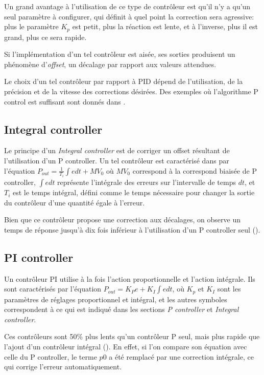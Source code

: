 Un grand avantage à l'utilisation de ce type de contrôleur est qu'il n'y a qu'un seul paramètre à configurer, qui définit à quel point la correction sera agressive: plus le paramètre $K_{p}$ est petit, plus la réaction est lente, et à l'inverse, plus il est grand, plus ce sera rapide.

Si l'implémentation d'un tel contrôleur est aisée, ses sorties produisent un phénomène d'\emph{offset}, un décalage par rapport aux valeurs attendues.

Le choix d'un tel contrôleur par rapport à PID dépend de l'utilisation, de la précision et de la vitesse des corrections désirées.
Des exemples où l'algorithme P control est suffisant sont donnés dans \cite{sellers2001overview}.

\subsection{Integral controller}
Le principe d'un \emph{Integral controller} est de corriger un offset résultant de l'utilisation d'un P controller.
Un tel contrôleur est caractérisé dans \cite{svrcek2006real} par l'équation
$P_{out} = \frac{1}{T_{i}}\int e dt + MV_{0}$ où $MV_{0}$ correspond à la correspond biaisée de P controller,
$\int e dt$ représente l'intégrale des erreurs sur l'intervalle de temps $dt$, et $T_{i}$ est le temps intégral, défini comme le temps nécessaire pour changer la sortie du contrôleur d'une quantité égale à l'erreur.

Bien que ce contrôleur propose une correction aux décalages, on observe un temps de réponse jusqu'à dix fois inférieur à l'utilisation d'un P controller seul (\cite{svrcek2006real}).

\subsection{PI controller}
Un contrôleur PI utilise à la fois l'action proportionnelle et l'action intégrale.
Ils sont caractérisés par l'équation $P_{out} = K_{P} e + K_{I} \int e dt$, où $K_{p}$ et $K_{I}$ sont les paramètres de réglages proportionnel et intégral,
et les autres symboles correspondent à ce qui est indiqué dans les sections \emph{P controller} et \emph{Integral controller}.

Ces contrôleurs sont 50\% plus lents qu'un contrôleur P seul, mais plus rapide que l'ajout d'un contrôleur intégral (\cite{svrcek2006real}).
En effet, si l'on compare son équation avec celle du P controller, le terme $p0$ a été remplacé par une correction intégrale, ce qui corrige l'erreur automatiquement.

